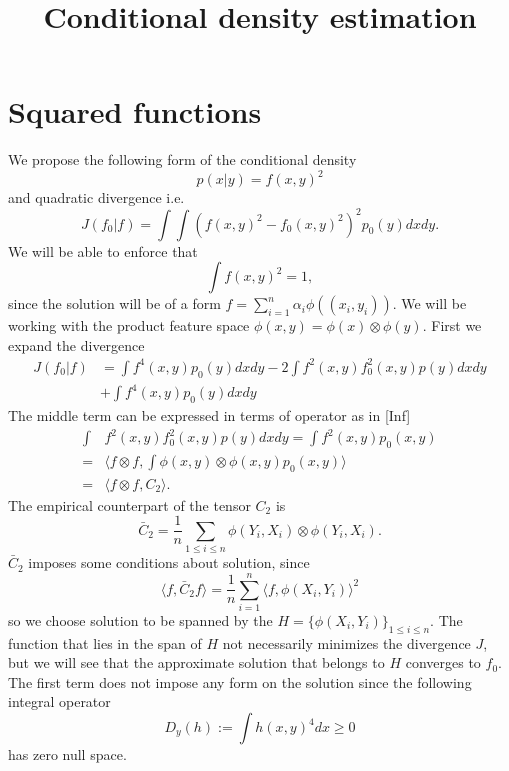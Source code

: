 \documentclass[10pt]{article}
\title{Conditional density estimation}
\begin{document}
\maketitle

\begin{abstract}
\end{abstract}



\section{Squared functions}
We propose the following form of the conditional density 
\begin{equation}
 p(x|y) = f(x,y)^2
\end{equation}
and quadratic  divergence i.e.
\begin{equation}
 J(f_0|f) = \int \int (f(x,y)^2 - f_0(x,y)^2)^2 p_0(y) dx dy. 
\end{equation}
We will be able to enforce that 
\begin{equation}
\int f(x,y)^2 =1,  
\end{equation}
since the solution will be of a form $f = \sum_{i=1}^n \alpha_i \phi((x_i,y_i))$. We will be working with the product feature space  $\phi(x,y) = \phi(x) \otimes \phi(y)$. First we expand the divergence
\begin{align}
 J(f_0|f) &= \int f^4(x,y) p_0(y) dx dy - 2 \int f^2(x,y) f_0^2(x,y) p(y) dx dy  \\
 &+ \int f^4(x,y) p_0(y) dx dy 
\end{align}
The middle term can be expressed in terms of operator as in [Inf] 
\begin{align}
\int &f^2(x,y) f_0^2(x,y) p(y) dx dy = \int f^2(x,y) p_0(x,y) \\
 =&  \langle f \otimes f  , \int \phi(x,y) \otimes \phi(x,y) p_0(x,y) \rangle \\
 =& \langle f \otimes f  , C_2 \rangle.
\end{align}
The empirical counterpart of the tensor $C_2$ is
\begin{equation}
 \bar C_2 = \frac 1 n \sum_{1 \leq i \leq n } \phi(Y_{i},X_{i}) \otimes \phi(Y_{i},X_{i}). 
\end{equation}
$\bar C_2$ imposes some conditions about solution, since 
\begin{equation}
 \langle f, \bar C_2 f \rangle = \frac 1 n \sum_{i=1}^n \langle f , \phi(X_i,Y_i) \rangle^2   
\end{equation}
so we choose solution to be spanned by the $H = \{ \phi(X_i,Y_i) \}_{1 \leq i \leq n}$. The function that lies in the span of $H$ not necessarily minimizes the divergence $J$, but we will see that the approximate solution that belongs to $H$ converges to $f_0$. The first term does not impose any form on the solution since the following integral operator
\begin{equation}
 D_y(h) := \int h(x,y)^4 dx \geq 0
\end{equation}
has zero null space.
\end{document}
